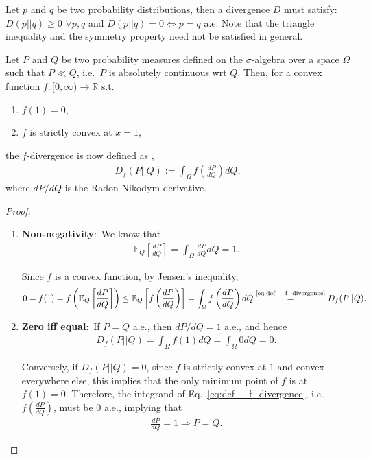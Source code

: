 \begin{defn}[Divergence]
	Let $p$ and $q$ be two probability distributions, then a divergence $D$ must satisfy:~$D(p\vert\vert q) \geq 0$ $\forall p,q$ and $D(p\vert\vert q) = 0 \Leftrightarrow p = q$ a.e. Note that the triangle inequality and the symmetry property need not be satisfied in general.
\end{defn}

\begin{exmp}[$f$-Divergence]
	Let $P$ and $Q$ be two probability measures defined on the $\sigma$-algebra over a space $\Omega$ such that $P \ll Q$, i.e.~$P$ is absolutely continuous wrt $Q$. Then, for a convex function $f:[0, \infty)\rightarrow \mathbb R$ s.t.
	
	\begin{enumerate}[label=(\roman*)]
		\item $f(1) = 0$, 
		\item $f$ is strictly convex at $x = 1$,
	\end{enumerate}
	
	\noindent the $f$-divergence is now defined as \cite{ece_ece_5630_lectures6}, 
	\begin{align}\label{eq:def__f_divergence}
		D_{f}(P\vert\vert Q) := \int_{\Omega} f\left( \frac{dP}{dQ} \right)dQ, 
	\end{align}
	where $dP/dQ$ is the Radon-Nikodym derivative.
\end{exmp}

\begin{proof}
	\begin{enumerate}
		\item \textbf{Non-negativity}:~We know that 
		\begin{align}
			\mathbb E_{Q}\left[ \frac{dP}{dQ} \right] = \int_{\Omega} \frac{dP}{dQ} dQ = 1.
		\end{align}
		
		Since $f$ is a convex function, by Jensen's inequality,
		\begin{align}
			0 = f(1) = f\left(\mathbb E_{Q}\left[ \frac{dP}{dQ} \right]\right) \leq \mathbb E_{Q}\left[ f\left( \frac{dP}{dQ} \right) \right] = \int_{\Omega} f\left( \frac{dP}{dQ} \right) dQ \overset{\scriptsize\eqref{eq:def__f_divergence}}{=} D_{f}(P\vert\vert Q).
		\end{align}
		
		\item \textbf{Zero iff equal}:~If $P = Q$ a.e., then $dP / dQ = 1$ a.e., and hence
		\begin{align}
			D_{f}(P\vert\vert Q) = \int_{\Omega} f(1)dQ = \int_{\Omega} 0dQ = 0.
		\end{align}
		
		Conversely, if $D_{f}(P\vert\vert Q) = 0$, since $f$ is strictly convex at $1$ and convex everywhere else, this implies that the only minimum point of $f$ is at $f(1) = 0$. Therefore, the integrand of Eq.~\eqref{eq:def__f_divergence}, i.e.~$f\left(\frac{dP}{dQ}\right)$, must be $0$ a.e., implying that 
		\begin{align}
			\frac{dP}{dQ} = 1\Rightarrow P = Q.
		\end{align}
	\end{enumerate}
\end{proof}

